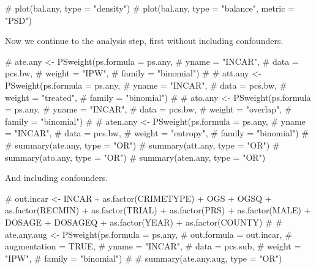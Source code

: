 \documentclass[
  letterpaper,
  DIV=11,
  numbers=noendperiod]{scrartcl}
\newenvironment{Shaded}{\begin{snugshade}}{\end{snugshade}}
\newcommand{\CommentTok}[1]{\textcolor[rgb]{0.37,0.37,0.37}{#1}}
\begin{document}
\begin{Shaded}
\begin{Highlighting}[]
\CommentTok{\# plot(bal.any, type = "density")}
\CommentTok{\# plot(bal.any, type = "balance", metric = "PSD")}
\end{Highlighting}
\end{Shaded}

Now we continue to the analysis step, first without including
confounders.

\begin{Shaded}
\begin{Highlighting}[]
\CommentTok{\# ate.any \textless{}{-} PSweight(ps.formula = ps.any, }
\CommentTok{\#                     yname = "INCAR", }
\CommentTok{\#                     data = pcs.bw,}
\CommentTok{\#                     weight = "IPW",}
\CommentTok{\#                     family = "binomial")}
\CommentTok{\# }
\CommentTok{\# att.any \textless{}{-} PSweight(ps.formula = ps.any, }
\CommentTok{\#                     yname = "INCAR", }
\CommentTok{\#                     data = pcs.bw,}
\CommentTok{\#                     weight = "treated",}
\CommentTok{\#                     family = "binomial")}
\CommentTok{\# }
\CommentTok{\# ato.any \textless{}{-} PSweight(ps.formula = ps.any, }
\CommentTok{\#                     yname = "INCAR", }
\CommentTok{\#                     data = pcs.bw,}
\CommentTok{\#                     weight = "overlap",}
\CommentTok{\#                     family = "binomial")}
\CommentTok{\# }
\CommentTok{\# aten.any \textless{}{-} PSweight(ps.formula = ps.any, }
\CommentTok{\#                     yname = "INCAR", }
\CommentTok{\#                     data = pcs.bw,}
\CommentTok{\#                     weight = "entropy",}
\CommentTok{\#                     family = "binomial")}
\CommentTok{\# }
\CommentTok{\# summary(ate.any, type = "OR")}
\CommentTok{\# summary(att.any, type = "OR")}
\CommentTok{\# summary(ato.any, type = "OR")}
\CommentTok{\# summary(aten.any, type = "OR")}
\end{Highlighting}
\end{Shaded}

And including confounders.

\begin{Shaded}
\begin{Highlighting}[]
\CommentTok{\# out.incar \textless{}{-} INCAR \textasciitilde{} as.factor(CRIMETYPE) + OGS + OGSQ + as.factor(RECMIN) + as.factor(TRIAL) + as.factor(PRS) + as.factor(MALE) + DOSAGE + DOSAGEQ + as.factor(YEAR) + as.factor(COUNTY)}
\CommentTok{\# }
\CommentTok{\# ate.any.aug \textless{}{-} PSweight(ps.formula = ps.any, }
\CommentTok{\#                         out.formula = out.incar,}
\CommentTok{\#                         augmentation = TRUE,}
\CommentTok{\#                         yname = "INCAR", }
\CommentTok{\#                         data = pcs.sub,}
\CommentTok{\#                         weight = "IPW",}
\CommentTok{\#                         family = "binomial")}
\CommentTok{\# }
\CommentTok{\# summary(ate.any.aug, type = "OR")}
\end{Highlighting}
\end{Shaded}
\end{document}
